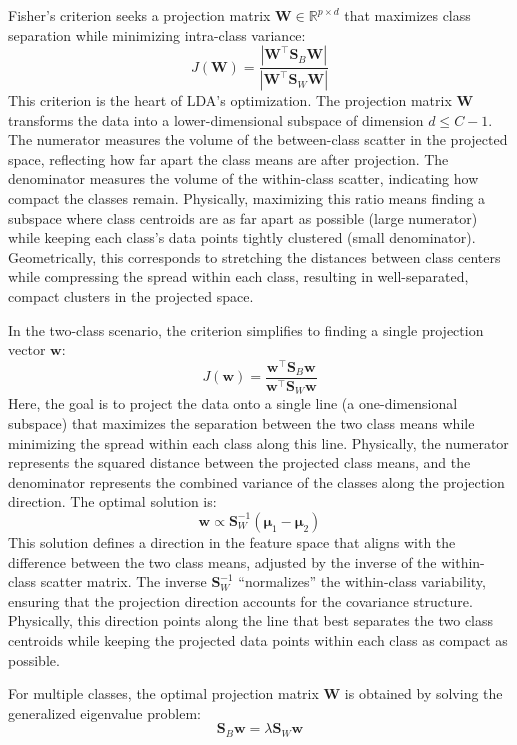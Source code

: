 \documentclass[12pt,a4paper]{article}
\begin{document}
Fisher’s criterion seeks a projection matrix $\mathbf{W} \in \mathbb{R}^{p \times d}$ that maximizes class separation while minimizing intra-class variance:
\[
J(\mathbf{W}) = \frac{|\mathbf{W}^\top \mathbf{S}_B \mathbf{W}|}{|\mathbf{W}^\top \mathbf{S}_W \mathbf{W}|}
\]
This criterion is the heart of LDA’s optimization. The projection matrix $\mathbf{W}$ transforms the data into a lower-dimensional subspace of dimension $d \leq C-1$. The numerator measures the volume of the between-class scatter in the projected space, reflecting how far apart the class means are after projection. The denominator measures the volume of the within-class scatter, indicating how compact the classes remain. Physically, maximizing this ratio means finding a subspace where class centroids are as far apart as possible (large numerator) while keeping each class’s data points tightly clustered (small denominator). Geometrically, this corresponds to stretching the distances between class centers while compressing the spread within each class, resulting in well-separated, compact clusters in the projected space.

In the two-class scenario, the criterion simplifies to finding a single projection vector $\mathbf{w}$:
\[
J(\mathbf{w}) = \frac{\mathbf{w}^\top \mathbf{S}_B \mathbf{w}}{\mathbf{w}^\top \mathbf{S}_W \mathbf{w}}
\]
Here, the goal is to project the data onto a single line (a one-dimensional subspace) that maximizes the separation between the two class means while minimizing the spread within each class along this line. Physically, the numerator represents the squared distance between the projected class means, and the denominator represents the combined variance of the classes along the projection direction. The optimal solution is:
\[
\mathbf{w} \propto \mathbf{S}_W^{-1} (\boldsymbol{\mu}_1 - \boldsymbol{\mu}_2)
\]
This solution defines a direction in the feature space that aligns with the difference between the two class means, adjusted by the inverse of the within-class scatter matrix. The inverse $\mathbf{S}_W^{-1}$ ``normalizes'' the within-class variability, ensuring that the projection direction accounts for the covariance structure. Physically, this direction points along the line that best separates the two class centroids while keeping the projected data points within each class as compact as possible.

For multiple classes, the optimal projection matrix $\mathbf{W}$ is obtained by solving the generalized eigenvalue problem:
\[
\mathbf{S}_B \mathbf{w} = \lambda \mathbf{S}_W \mathbf{w}
\]
\end{document}
